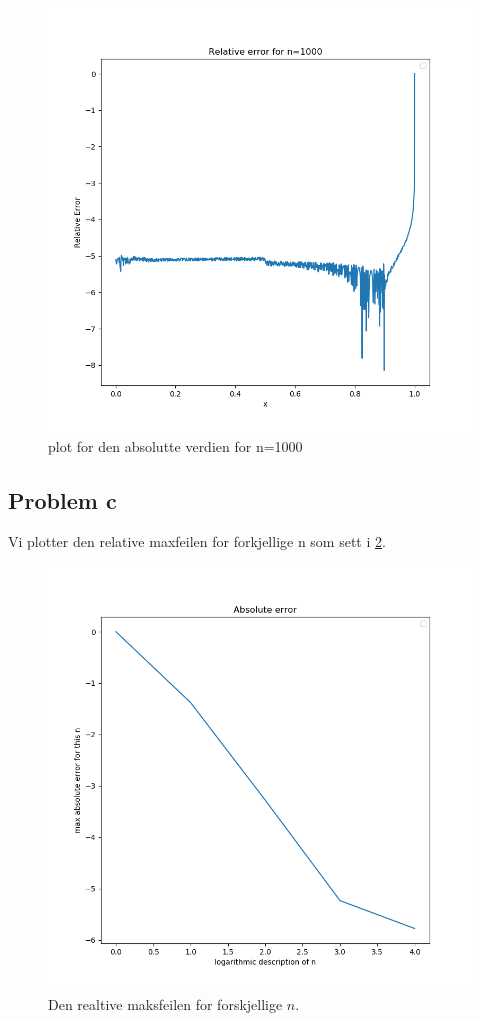 \documentclass[english,notitlepage]{revtex4-1}  %
\begin{document}
\begin{figure}
	\centering
	\includegraphics[scale=0.5]{Images/relerr1000.png}
	\caption{plot for den absolutte verdien for n=1000}
	\label{relerrn1000}
\end{figure}

\subsection*{Problem c}

Vi plotter den relative maxfeilen for forkjellige n som sett i \ref{relerr}.

\begin{figure}
\centering
\includegraphics[scale=0.5]{Images/relerr.png}
\caption{Den realtive maksfeilen for forskjellige $n$.}
\label{relerr}
\end{figure}
\end{document}
